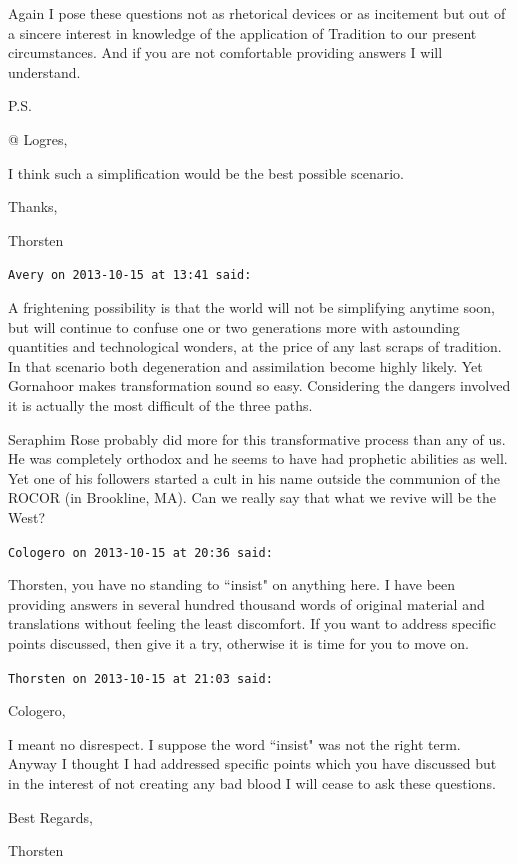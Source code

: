 \begin{footnotesize}
\begin{sffamily}
Again I pose these questions not as rhetorical devices or as incitement but out of a sincere interest in knowledge of
the application of Tradition to our present circumstances. And if you are not comfortable providing answers I will
understand.

P.S.

@ Logres,

I think such a simplification would be the best possible scenario. 

Thanks,

Thorsten


\hfill

\texttt{Avery on 2013-10-15 at 13:41 said: }

A frightening possibility is that the world will not be simplifying anytime soon, but will continue to confuse one or
two generations more with astounding quantities and technological wonders, at the price of any last scraps of
tradition. In that scenario both degeneration and assimilation become highly likely. Yet Gornahoor makes transformation
sound so easy. Considering the dangers involved it is actually the most difficult of the three paths.

Seraphim Rose probably did more for this transformative process than any of us. He was completely orthodox and he seems
to have had prophetic abilities as well. Yet one of his followers started a cult in his name outside the communion of
the ROCOR (in Brookline, MA). Can we really say that what we revive will be the West?


\hfill

\texttt{Cologero on 2013-10-15 at 20:36 said: }

Thorsten, you have no standing to ``insist" on anything here. I have been providing answers in several hundred thousand
words of original material and translations without feeling the least discomfort. If you want to address specific
points discussed, then give it a try, otherwise it is time for you to move on.


\hfill

\texttt{Thorsten on 2013-10-15 at 21:03 said: }

Cologero,

I meant no disrespect. I suppose the word ``insist" was not the right term. Anyway I thought I had addressed specific
points which you have discussed but in the interest of not creating any bad blood I will cease to ask these questions.

Best Regards,

Thorsten



\end{sffamily}
\end{footnotesize}
